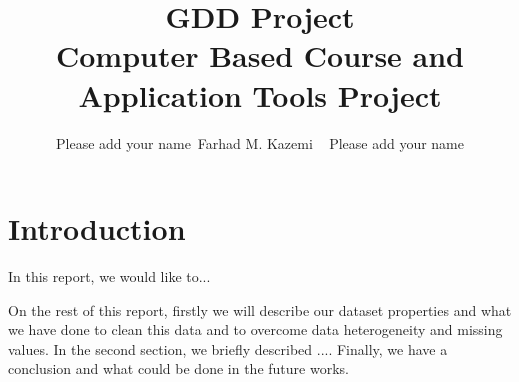 \documentclass[12pt,letterpaper]{article}
\begin{document}
\title{GDD Project \\ \vspace{.5 cm} {\Large Computer Based Course and Application Tools Project} }
\author{Please add your name~Farhad M. Kazemi ~ Please add your name}
\maketitle

\section{Introduction}


In this report, we would like to...

On the rest of this report, firstly we will describe our dataset properties and what we have done to clean this data and to overcome data heterogeneity and missing values. In the second section, we briefly described ....
Finally, we have a conclusion and what could be done in the future works.
\newpage
\end{document}
